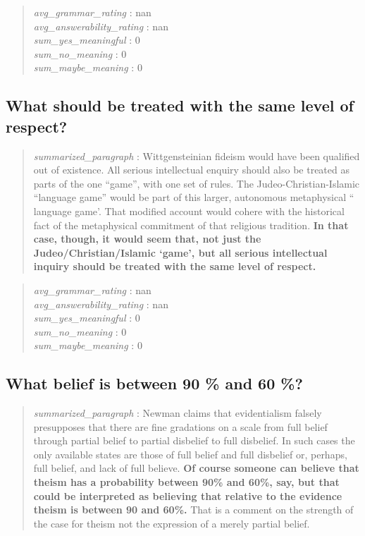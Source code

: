 \begin{quote}
\emph{avg\_grammar\_rating} : nan\\
\emph{avg\_answerability\_rating} : nan\\
\emph{sum\_yes\_meaningful} : 0\\
\emph{sum\_no\_meaning} : 0\\
\emph{sum\_maybe\_meaning} : 0
\end{quote}

\hypertarget{what-should-be-treated-with-the-same-level-of-respect}{%
\subsection{What should be treated with the same level of
respect?}\label{what-should-be-treated-with-the-same-level-of-respect}}

\begin{quote}
\emph{summarized\_paragraph} : Wittgensteinian fideism would have been
qualified out of existence. All serious intellectual enquiry should also
be treated as parts of the one ``game'', with one set of rules. The
Judeo-Christian-Islamic ``language game'' would be part of this larger,
autonomous metaphysical `` language game'. That modified account would
cohere with the historical fact of the metaphysical commitment of that
religious tradition. \textbf{In that case, though, it would seem that,
not just the Judeo/Christian/Islamic `game', but all serious
intellectual inquiry should be treated with the same level of respect.}
\end{quote}

\begin{quote}
\emph{avg\_grammar\_rating} : nan\\
\emph{avg\_answerability\_rating} : nan\\
\emph{sum\_yes\_meaningful} : 0\\
\emph{sum\_no\_meaning} : 0\\
\emph{sum\_maybe\_meaning} : 0
\end{quote}

\hypertarget{what-belief-is-between-90-and-60}{%
\subsection{What belief is between 90 \% and 60
\%?}\label{what-belief-is-between-90-and-60}}

\begin{quote}
\emph{summarized\_paragraph} : Newman claims that evidentialism falsely
presupposes that there are fine gradations on a scale from full belief
through partial belief to partial disbelief to full disbelief. In such
cases the only available states are those of full belief and full
disbelief or, perhaps, full belief, and lack of full believe. \textbf{Of
course someone can believe that theism has a probability between 90\%
and 60\%, say, but that could be interpreted as believing that relative
to the evidence theism is between 90 and 60\%.} That is a comment on the
strength of the case for theism not the expression of a merely partial
belief.
\end{quote}

